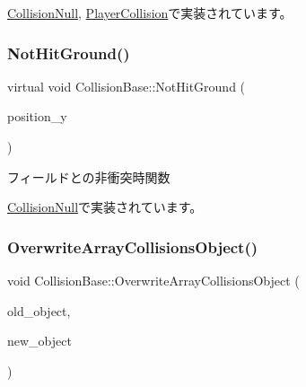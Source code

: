 \mbox{\hyperlink{class_collision_null_aba2a574ab42dca618c41dd0b9562f614}{Collision\+Null}}, \mbox{\hyperlink{class_player_collision_a21b8f825ea142024212ab5fe3f427ab0}{Player\+Collision}}で実装されています。

\mbox{\label{class_collision_base_ac1ed5b1c0c9b6b70b432e6656f9c4b45}} 
\subsubsection{\texorpdfstring{Not\+Hit\+Ground()}{NotHitGround()}}
{\footnotesize\ttfamily virtual void Collision\+Base\+::\+Not\+Hit\+Ground (\begin{DoxyParamCaption}\item[{float}]{position\+\_\+y }\end{DoxyParamCaption})\hspace{0.3cm}{\ttfamily [pure virtual]}}



フィールドとの非衝突時関数 



\mbox{\hyperlink{class_collision_null_ad456a03a3e3d55d8d408b7ed28ce7911}{Collision\+Null}}で実装されています。

\mbox{\label{class_collision_base_a4a7bba0fc9d39e27dc58d695f04cf186}} 
\subsubsection{\texorpdfstring{Overwrite\+Array\+Collisions\+Object()}{OverwriteArrayCollisionsObject()}}
{\footnotesize\ttfamily void Collision\+Base\+::\+Overwrite\+Array\+Collisions\+Object (\begin{DoxyParamCaption}\item[{\mbox{\hyperlink{class_collision_objects}{Collision\+Objects}} $\ast$}]{old\+\_\+object,  }\item[{\mbox{\hyperlink{class_collision_objects}{Collision\+Objects}} $\ast$}]{new\+\_\+object }\end{DoxyParamCaption})\hspace{0.3cm}{\ttfamily [inline]}}



